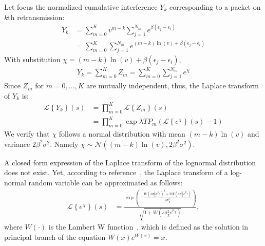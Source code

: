 Let focus the normalized cumulative interference $Y_k$ corresponding to a packet on $k$th retransmission:
\begin{align*}
Y_k &=\sum_{m=0}^{K} v^{m-k}\sum_{j=1}^{N_m} e^{\beta \left( \epsilon_j - \epsilon_i \right) } \\
&=\sum_{m=0}^{K}\sum_{j=1}^{N_m} e^{\left(m-k\right) \ln(v)+\beta \left( \epsilon_j - \epsilon_i \right) } 
\end{align*}
With substitution $\chi = \left(m-k\right) \ln(v)+\beta \left( \epsilon_j - \epsilon_i \right)$, 
\begin{align}
	Y_k=\sum_{m=0}^{K} Z_m  = \sum_{m=0}^{K}\sum_{j=1}^{N_m} e^{\chi}
\end{align} 
Since $Z_m$ for $m=0,...,K$ are mutually independent, thus, the Laplace transform of $Y_k$ is:
\begin{align}
	\label{eq:laplace-transform-y-form-1}
	\mathcal{L} \left\lbrace Y_k \right\rbrace \left( s \right) &= \prod_{m=0}^{K} \mathcal{L} \left\lbrace Z_m \right\rbrace \left( s \right) \nonumber\\
	&=\prod_{m=0}^{K} \exp{\lambda T P_m \left(  \mathcal{L} \left\lbrace e^{\chi} \right\rbrace \left( s \right)  - 1\right) }
\end{align}
We verify that $\chi$ follows a normal distribution with mean $\left(m-k\right) \ln(v)$ and variance $2\beta^2\sigma^2$. Namely $\chi \sim \mathcal{N}\left( \left(m-k\right) \ln(v), 2\beta^2\sigma^2\right)$.

A closed form expression of the Laplace transform of the lognormal distribution does not
exist. Yet, according to reference~\cite{asmussen2016laplace}, the Laplace transform of a log-normal random variable can be approximated as follows:
\begin{align}
\label{eq:laplace-transform-lognormal-form-1}
\mathcal{L} \left\lbrace e^{\chi} \right\rbrace \left( s \right)
&= \frac{\exp(-\frac{W(s \sigma_{\chi}^2 e^{\mu_{\chi}} )^2 + 2W(s \sigma_{\chi}^2 e^{\mu_{\chi}})}{2\sigma_{\chi}^2})}{\sqrt{1 + W(s \sigma_{\chi}^2 e^{\mu_{\chi}})}},
\end{align}
where $W\left( \cdot \right)$ is the Lambert W function~\cite{corless1996lambertw}, which is defined as the solution in principal branch of the
equation $W\left(x\right) e^{W \left( x\right) }= x$.

